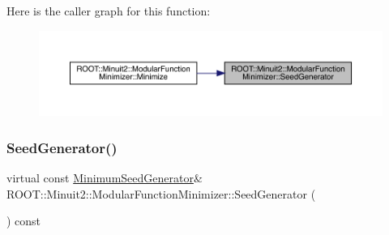 Here is the caller graph for this function\+:\nopagebreak
\begin{figure}[H]
\begin{center}
\leavevmode
\includegraphics[width=350pt]{d3/dc8/classROOT_1_1Minuit2_1_1ModularFunctionMinimizer_a742930de97b0ce9ba23773874ae0894b_icgraph}
\end{center}
\end{figure}
\mbox{\label{classROOT_1_1Minuit2_1_1ModularFunctionMinimizer_a742930de97b0ce9ba23773874ae0894b}} 
\subsubsection{\texorpdfstring{SeedGenerator()}{SeedGenerator()}\hspace{0.1cm}{\footnotesize\ttfamily [2/2]}}
{\footnotesize\ttfamily virtual const \mbox{\hyperlink{classROOT_1_1Minuit2_1_1MinimumSeedGenerator}{Minimum\+Seed\+Generator}}\& R\+O\+O\+T\+::\+Minuit2\+::\+Modular\+Function\+Minimizer\+::\+Seed\+Generator (\begin{DoxyParamCaption}{ }\end{DoxyParamCaption}) const\hspace{0.3cm}{\ttfamily [pure virtual]}}



